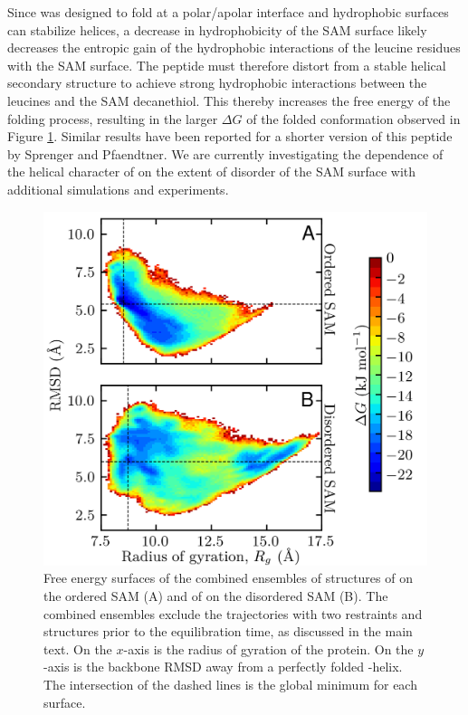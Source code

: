 Since \pep{} was designed to fold at a polar/apolar interface\cite{DeGrado1985} and hydrophobic surfaces can stabilize helices\cite{Levine2016}, a decrease in hydrophobicity of the SAM surface likely decreases the entropic gain of the hydrophobic interactions of the leucine residues with the SAM surface. 
The peptide must therefore distort from a stable helical secondary structure to achieve strong hydrophobic interactions between the leucines and the SAM decanethiol. 
This thereby increases the free energy of the folding process, resulting in the larger $\Delta G$ of the folded conformation observed in Figure \ref{fig:helix-free_order}. 
Similar results have been reported for a shorter version of this peptide by Sprenger and Pfaendtner\cite{Sprenger2016}. 
We are currently investigating the dependence of the helical character of \pep{} on the extent of disorder of the SAM surface with additional simulations and experiments.  

\begin{figure}
    \center
    \includegraphics[width=\single]{figures-helix/comparison_free_energy_plots.png}
    \caption{
        Free energy surfaces of the combined ensembles of structures of \pep{} on the ordered SAM (A) and of \pep{} on the disordered SAM (B). 
        The combined ensembles exclude the trajectories with two restraints and structures prior to the equilibration time, as discussed in the main text. 
        On the $x$-axis is the radius of gyration of the protein. 
        On the $y$-axis is the backbone RMSD away from a perfectly folded \textalpha{}-helix. 
        The intersection of the dashed lines is the global minimum for each surface. 
    }
    \label{fig:helix-free_order}
\end{figure}

